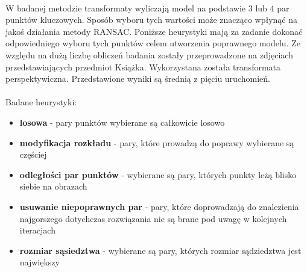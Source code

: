 \documentclass[../main.tex]{subfiles}
\begin{document}
    \paragraph{}
    W badanej metodzie transformaty wyliczają model na podstawie 3 lub 4 par punktów kluczowych. Sposób wyboru tych wartości może znacząco wpłynąć na jakoś działania metody RANSAC. Poniższe heurystyki mają za zadanie dokonać odpowiedniego wyboru tych punktów celem utworzenia poprawnego modelu. Ze względu na dużą liczbę obliczeń badania zostały przeprowadzone na zdjęciach przedstawiających przedmiot Książka. Wykorzystana została transformata perspektywiczna. Przedstawione wyniki są średnią z pięciu uruchomień.
    
    \paragraph{}
    Badane heurystyki:
    \begin{itemize}
     \item{\textbf{losowa} - pary punktów wybierane są całkowicie losowo}
     \item{\textbf{modyfikacja rozkładu} - pary, które prowadzą do poprawy wybierane są częściej}
     \item{\textbf{odległości par punktów} - wybierane są pary, których punkty leżą blisko siebie na obrazach}
     \item{\textbf{usuwanie niepoprawnych par} - pary, które doprowadzają do znalezienia najgorszego dotychczas rozwiązania nie są brane pod uwagę w kolejnych iteracjach}
     \item{\textbf{rozmiar sąsiedztwa} - wybierane są pary, których rozmiar sądziedztwa jest największy}
    \end{itemize}
    
\end{document}
